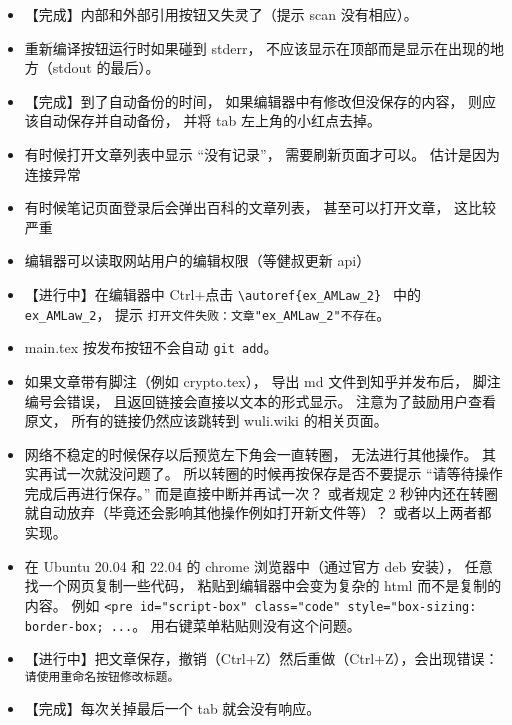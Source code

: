 \begin{itemize}
\item 【完成】内部和外部引用按钮又失灵了（提示 scan 没有相应）。

\item 重新编译按钮运行时如果碰到 stderr， 不应该显示在顶部而是显示在出现的地方（stdout 的最后）。

\item 【完成】到了自动备份的时间， 如果编辑器中有修改但没保存的内容， 则应该自动保存并自动备份， 并将 tab 左上角的小红点去掉。

\item 有时候打开文章列表中显示 “没有记录”， 需要刷新页面才可以。 估计是因为连接异常

\item 有时候笔记页面登录后会弹出百科的文章列表， 甚至可以打开文章， 这比较严重

\item 编辑器可以读取网站用户的编辑权限（等健叔更新 api）

\item 【进行中】在编辑器中 Ctrl+点击 \verb`\autoref{ex_AMLaw_2} ` 中的 \verb`ex_AMLaw_2`， 提示 \verb`打开文件失败：文章"ex_AMLaw_2"不存在`。

\item main.tex 按发布按钮不会自动 \verb`git add`。

\item 如果文章带有脚注（例如 crypto.tex）， 导出 md 文件到知乎并发布后， 脚注编号会错误， 且返回链接会直接以文本的形式显示。 注意为了鼓励用户查看原文， 所有的链接仍然应该跳转到 wuli.wiki 的相关页面。

\item 网络不稳定的时候保存以后预览左下角会一直转圈， 无法进行其他操作。 其实再试一次就没问题了。 所以转圈的时候再按保存是否不要提示 “请等待操作完成后再进行保存。” 而是直接中断并再试一次？ 或者规定 2 秒钟内还在转圈就自动放弃（毕竟还会影响其他操作例如打开新文件等）？ 或者以上两者都实现。

\item 在 Ubuntu 20.04 和 22.04 的 chrome 浏览器中（通过官方 deb 安装）， 任意找一个网页复制一些代码， 粘贴到编辑器中会变为复杂的 html 而不是复制的内容。 例如 \verb`<pre id="script-box" class="code" style="box-sizing: border-box; ...`。 用右键菜单粘贴则没有这个问题。

\item 【进行中】把文章保存，撤销（Ctrl+Z）然后重做（Ctrl+Z），会出现错误： \verb`请使用重命名按钮修改标题。`

\item 【完成】每次关掉最后一个 tab 就会没有响应。


\end{itemize}
